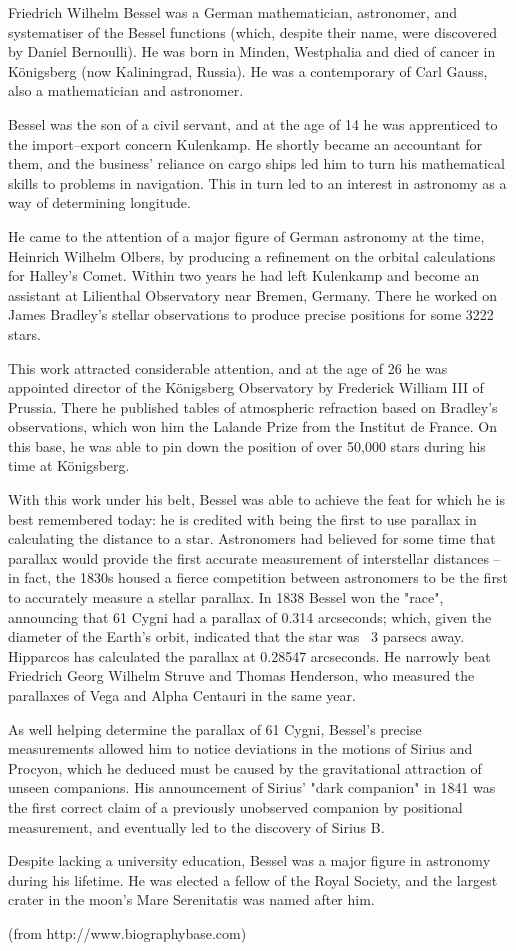 Friedrich Wilhelm Bessel was a German mathematician, astronomer, and systematiser of the Bessel functions (which, despite their name, were discovered by Daniel Bernoulli). He was born in Minden, Westphalia and died of cancer in K\"onigsberg (now Kaliningrad, Russia). He was a contemporary of Carl Gauss, also a mathematician and astronomer.
 
Bessel was the son of a civil servant, and at the age of 14 he was apprenticed to the import--export concern Kulenkamp. He shortly became an accountant for them, and the business' reliance on cargo ships led him to turn his mathematical skills to problems in navigation. This in turn led to an interest in astronomy as a way of determining longitude.
 
He came to the attention of a major figure of German astronomy at the time, Heinrich Wilhelm Olbers, by producing a refinement on the orbital calculations for Halley's Comet. Within two years he had left Kulenkamp and become an assistant at Lilienthal Observatory near Bremen, Germany. There he worked on James Bradley's stellar observations to produce precise positions for some 3222 stars.
 
 This work attracted considerable attention, and at the age of 26 he was appointed director of the K\"onigsberg Observatory by Frederick William III of Prussia. There he published tables of atmospheric refraction based on Bradley's observations, which won him the Lalande Prize from the Institut de France. On this base, he was able to pin down the position of over 50,000 stars during his time at K\"onigsberg.
 
 With this work under his belt, Bessel was able to achieve the feat for which he is best remembered today: he is credited with being the first to use parallax in calculating the distance to a star. Astronomers had believed for some time that parallax would provide the first accurate measurement of interstellar distances -- in fact, the 1830s housed a fierce competition between astronomers to be the first to accurately measure a stellar parallax. In 1838 Bessel won the "race", announcing that 61 Cygni had a parallax of 0.314 arcseconds; which, given the diameter of the Earth's orbit, indicated that the star was ~3 parsecs away. Hipparcos has calculated the parallax at 0.28547 arcseconds. He narrowly beat Friedrich Georg Wilhelm Struve and Thomas Henderson, who measured the parallaxes of Vega and Alpha Centauri in the same year.
 
 As well helping determine the parallax of 61 Cygni, Bessel's precise measurements allowed him to notice deviations in the motions of Sirius and Procyon, which he deduced must be caused by the gravitational attraction of unseen companions. His announcement of Sirius' "dark companion" in 1841 was the first correct claim of a previously unobserved companion by positional measurement, and eventually led to the discovery of Sirius B.
 
 Despite lacking a university education, Bessel was a major figure in astronomy during his lifetime. He was elected a fellow of the Royal Society, and the largest crater in the moon's Mare Serenitatis was named after him.


(from http://www.biographybase.com)